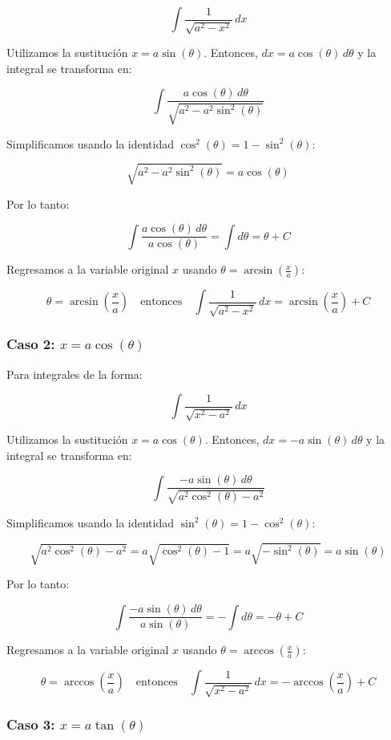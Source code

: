 \[
\int \frac{1}{\sqrt{a^2 - x^2}} \, dx
\]

Utilizamos la sustitución \( x = a \sin(\theta) \). Entonces, \( dx = a \cos(\theta) \, d\theta \) y la integral se transforma en:

\[
\int \frac{a \cos(\theta) \, d\theta}{\sqrt{a^2 - a^2 \sin^2(\theta)}}
\]

Simplificamos usando la identidad \(\cos^2(\theta) = 1 - \sin^2(\theta)\):

\[
\sqrt{a^2 - a^2 \sin^2(\theta)} = a \cos(\theta)
\]

Por lo tanto:

\[
\int \frac{a \cos(\theta) \, d\theta}{a \cos(\theta)} = \int d\theta = \theta + C
\]

Regresamos a la variable original \( x \) usando \(\theta = \arcsin\left(\frac{x}{a}\right)\):

\[
\theta = \arcsin\left(\frac{x}{a}\right) \quad \text{entonces} \quad \int \frac{1}{\sqrt{a^2 - x^2}} \, dx = \arcsin\left(\frac{x}{a}\right) + C
\]

\subsubsection{Caso 2: \( x = a \cos(\theta) \)}

Para integrales de la forma:

\[
\int \frac{1}{\sqrt{x^2 - a^2}} \, dx
\]

Utilizamos la sustitución \( x = a \cos(\theta) \). Entonces, \( dx = -a \sin(\theta) \, d\theta \) y la integral se transforma en:

\[
\int \frac{-a \sin(\theta) \, d\theta}{\sqrt{a^2 \cos^2(\theta) - a^2}}
\]

Simplificamos usando la identidad \(\sin^2(\theta) = 1 - \cos^2(\theta)\):

\[
\sqrt{a^2 \cos^2(\theta) - a^2} = a \sqrt{\cos^2(\theta) - 1} = a \sqrt{-\sin^2(\theta)} = a \sin(\theta)
\]

Por lo tanto:

\[
\int \frac{-a \sin(\theta) \, d\theta}{a \sin(\theta)} = - \int d\theta = -\theta + C
\]

Regresamos a la variable original \( x \) usando \(\theta = \arccos\left(\frac{x}{a}\right)\):

\[
\theta = \arccos\left(\frac{x}{a}\right) \quad \text{entonces} \quad \int \frac{1}{\sqrt{x^2 - a^2}} \, dx = -\arccos\left(\frac{x}{a}\right) + C
\]

\subsubsection{Caso 3: \( x = a \tan(\theta) \)}

